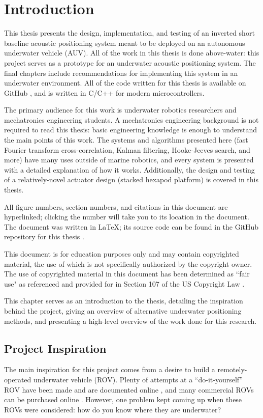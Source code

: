 \documentclass[11pt]{ucthesisCP}
\begin{document}
\chapter{Introduction} \label{chap:1c}
This thesis presents the design, implementation, and testing of an inverted short baseline acoustic positioning system meant to be deployed on an autonomous underwater vehicle (AUV). All of the work in this thesis is done above-water: this project serves as a prototype for an underwater acoustic positioning system. The final chapters include recommendations for implementing this system in an underwater environment. All of the code written for this thesis is available on GitHub \cite{thesisgit}, and is written in C/C++ for modern microcontrollers.

The primary audience for this work is underwater robotics researchers and mechatronics engineering students. A mechatronics engineering background is not required to read this thesis: basic engineering knowledge is enough to understand the main points of this work. The systems and algorithms presented here (fast Fourier transform cross-correlation, Kalman filtering, Hooke-Jeeves search, and more) have many uses outside of marine robotics, and every system is presented with a detailed explanation of how it works. Additionally, the design and testing of a relatively-novel actuator design (stacked hexapod platform) is covered in this thesis.

All figure numbers, section numbers, and citations in this document are hyperlinked; clicking the number will take you to its location in the document. The document was written in \LaTeX; its source code can be found in the GitHub repository for this thesis \cite{thesisgit}.

This document is for education purposes only and may contain copyrighted material, the use of which is not specifically authorized by the copyright owner. The use of copyrighted material in this document has been determined as ``fair use" as referenced and provided for in Section 107 of the US Copyright Law \cite{osfair} \cite{fairuse}.

This chapter serves as an introduction to the thesis, detailing the inspiration behind the project, giving an overview of alternative underwater positioning methods, and presenting a high-level overview of the work done for this research. 

\section{Project Inspiration} \label{sec:1s1}
The main inspiration for this project comes from a desire to build a remotely-operated underwater vehicle (ROV). Plenty of attempts at a “do-it-yourself” ROV have been made and are documented online \cite{cpsdrone}, and many commercial ROVs can be purchased online \cite{bluerov}. However, one problem kept coming up when these ROVs were considered: how do you know where they are underwater?
\end{document}
